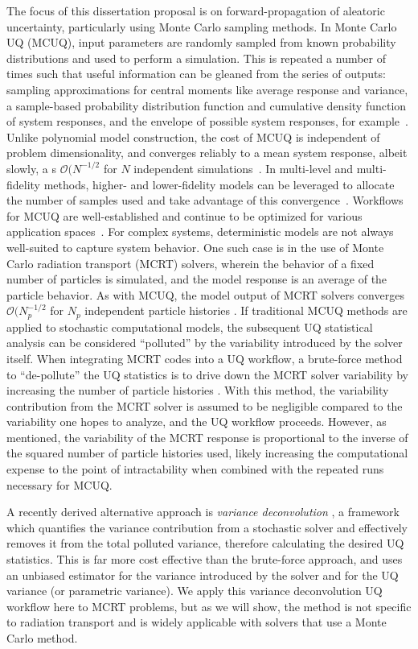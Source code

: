 The focus of this dissertation proposal is on forward-propagation of aleatoric uncertainty, particularly using Monte Carlo sampling methods. In Monte Carlo UQ (MCUQ), input parameters are randomly sampled from known probability distributions and used to perform a simulation. This is repeated a number of times such that useful information can be gleaned from the series of outputs: sampling approximations for central moments like average response and variance, a sample-based probability distribution function and cumulative density function of system responses, and the envelope of possible system responses, for example~\cite{wildey-presentation}. Unlike polynomial model construction, the cost of MCUQ is independent of problem dimensionality, and converges reliably to a mean system response, albeit slowly, a s $\mathcal{O}(N^{-1/2}$ for $N$ independent simulations~\cite{mcnp}. In multi-level and multi-fidelity methods, higher- and lower-fidelity models can be leveraged to allocate the number of samples used and take advantage of this convergence~\cite{wildey-presentation}. Workflows for MCUQ are well-established and continue to be optimized for various application spaces~\cite{zhang-survey}. For complex systems, deterministic models are not always well-suited to capture system behavior. One such case is in the use of Monte Carlo radiation transport (MCRT) solvers, wherein the behavior of a fixed number of particles is simulated, and the model response is an average of the particle behavior. As with MCUQ, the model output of MCRT solvers converges $\mathcal{O}(N_p^{-1/2}$ for $N_p$ independent particle histories \cite{mcnp}. If traditional MCUQ methods are applied to stochastic computational models, the subsequent UQ statistical analysis can be considered ``polluted'' by the variability introduced by the solver itself. When integrating MCRT codes into a UQ workflow, a brute-force method to ``de-pollute'' the UQ statistics is to drive down the MCRT solver variability by increasing the number of particle histories \cite{MCMC-paper}. With this method, the variability contribution from the MCRT solver is assumed to be negligible compared to the variability one hopes to analyze, and the UQ workflow proceeds. However, as mentioned, the variability of the MCRT response is proportional to the inverse of the squared number of particle histories used, likely increasing the computational expense to the point of intractability when combined with the repeated runs necessary for MCUQ. 

A recently derived alternative approach is \textit{variance deconvolution} \cite{Clements2021, ClementsANS2022}, a framework which quantifies the variance contribution from a stochastic solver and effectively removes it from the total polluted variance, therefore calculating the desired UQ statistics. This is far more cost effective than the brute-force approach, and uses an unbiased estimator for the variance introduced by the solver and for the UQ variance (or parametric variance). We apply this variance deconvolution UQ workflow here to MCRT problems, but as we will show, the method is not specific to radiation transport and is widely applicable with solvers that use a Monte Carlo method. 

